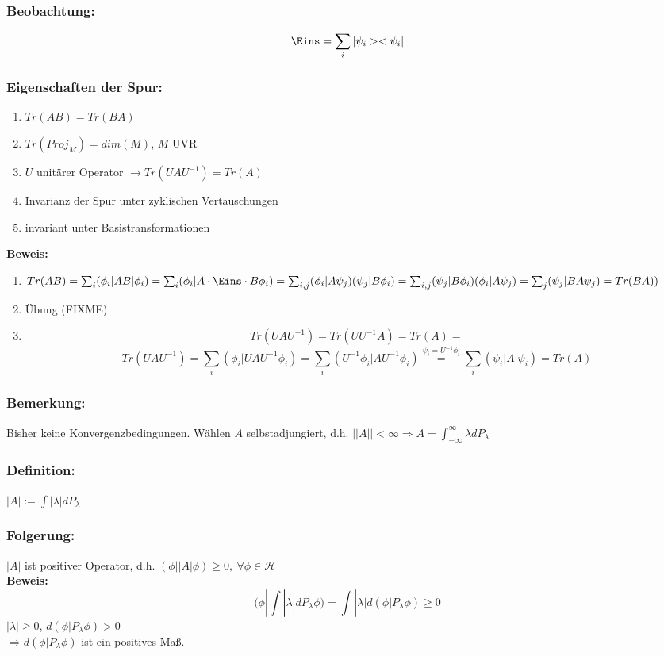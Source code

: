 \documentclass[twoside,a4paper]{scrartcl}
\renewcommand{\1}{\mathds{1}}
\newcommand{\Ra}{\Rightarrow}
\newcommand{\ra}{\rightarrow}
\renewcommand{\l}{\lambda}
\renewcommand{\H}{\mathcal{H}}
\begin{document}
\subsubsection*{Beobachtung:}
$$\Eins=\sum_i |\psi_i><\psi_i|$$

\subsubsection*{Eigenschaften der Spur:}
\begin{enumerate}
\item $Tr(AB)=Tr(BA)$
\item $Tr(Proj_M)=dim(M)$, $M$ UVR
\item $U$ unitärer Operator $\ra Tr(UAU^{-1})=Tr(A)$
\item Invarianz der Spur unter zyklischen Vertauschungen
\item invariant unter Basistransformationen
\end{enumerate}
\textbf{Beweis:}
\begin{enumerate}
\item $Tr(AB)=\sum_{i}(\phi_i|AB|\phi_i)=\sum_i (\phi_i|A \cdot \Eins \cdot B \phi_i)=\sum_{i,j} (\phi_i|A\psi_j)(\psi_j|B\phi_i)=\sum_{i,j} (\psi_j|B\phi_i)(\phi_i|A\psi_j)=\sum_j (\psi_j|BA\psi_j)=Tr(BA))$
\item Übung (FIXME)
\item $$Tr(UAU^{-1})=Tr(UU^{-1}A)=Tr(A)=$$
$$Tr(UAU^{-1})=\sum_i (\phi_i|UAU^{-1}\phi_i)=\sum_i (U^{-1}\phi_i|AU^{-1}\phi_i)\stackrel{\psi_i=U^{-1}\phi_i}{=}\sum_i (\psi_i|A|\psi_i)=Tr(A)$$
\end{enumerate}

\subsubsection*{Bemerkung:}
Bisher keine Konvergenzbedingungen. Wählen $A$ selbstadjungiert, d.h. $||A|| < \infty \Ra A=\int_{-\infty}^\infty \l dP_\l$
\subsubsection*{Definition:}
$|A|:= \int |\l|dP_\l$

\subsubsection*{Folgerung:}
$|A|$ ist positiver Operator, d.h. $(\phi| |A|\phi)\geq 0, \ \forall \phi\in \H$\\
\textbf{Beweis:}
$$(\phi|\int |\l| dP_\l \phi)=\int |\l| d(\phi|P_\l \phi) \geq 0$$
$|\l|\geq 0$, $d(\phi|P_\l \phi) >0$\\
$\Ra d(\phi|P_\l \phi)$ ist ein positives Maß.
\end{document}
